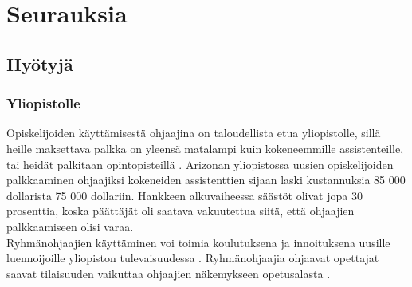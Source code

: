 \documentclass[finnish]{tktltiki2}
\theoremstyle{definition}
\theoremstyle{remark}
\begin{document}
\section{Seurauksia}

\subsection{Hyötyjä}

\subsubsection{Yliopistolle}
Opiskelijoiden käyttämisestä ohjaajina on taloudellista etua yliopistolle, sillä heille maksettava palkka on yleensä matalampi kuin kokeneemmille assistenteille, tai heidät palkitaan opintopisteillä \cite{Reges88}. Arizonan yliopistossa uusien opiskelijoiden palkkaaminen ohjaajiksi kokeneiden assistenttien sijaan laski kustannuksia 85 000 dollarista 75 000 dollariin. Hankkeen alkuvaiheessa säästöt olivat jopa 30 prosenttia, koska päättäjät oli saatava vakuutettua siitä, että ohjaajien palkkaamiseen olisi varaa.
\\
Ryhmänohjaajien käyttäminen voi toimia koulutuksena ja innoituksena uusille luennoijoille yliopiston tulevaisuudessa \cite{Roberts95, Morgan02}. Ryhmänohjaajia ohjaavat opettajat saavat tilaisuuden vaikuttaa ohjaajien näkemykseen opetusalasta \cite{Morgan02}. 
\end{document}
